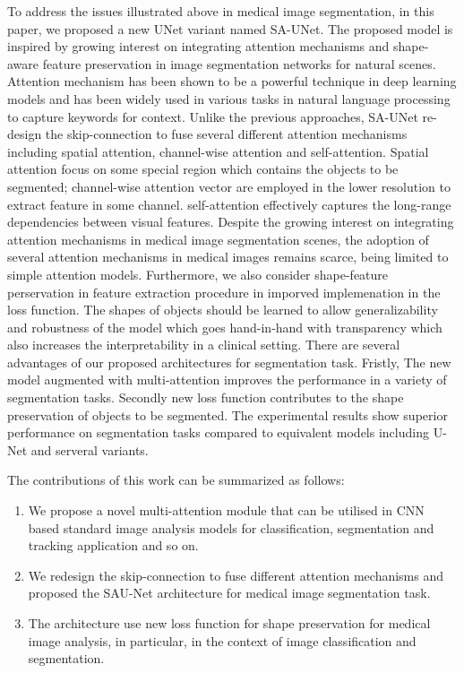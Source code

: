 \documentclass[UTF8]{article} %
\begin{document}
To address the issues illustrated above in medical image segmentation, in this paper, we proposed a new UNet variant named SA-UNet. The proposed model is inspired by growing interest on integrating attention mechanisms and shape-aware feature preservation in image segmentation networks for natural scenes. Attention mechanism has been shown to be a powerful technique in deep learning models and has been widely used in various tasks in natural language processing to capture keywords for context. Unlike the previous approaches, SA-UNet re-design the skip-connection to fuse several different attention mechanisms including spatial attention, channel-wise attention and self-attention. Spatial attention focus on some special region which contains the objects to be segmented; channel-wise attention vector are employed in the lower resolution to extract feature in some channel. self-attention effectively captures the long-range dependencies between visual features. Despite the growing interest on integrating attention mechanisms in medical image segmentation scenes, the adoption of several attention mechanisms in medical images remains scarce, being limited to simple attention models. Furthermore, we also consider shape-feature perservation in feature extraction procedure in imporved implemenation in the loss function.  The shapes of objects should be learned to allow generalizability and robustness of the model which goes hand-in-hand with transparency which also increases the interpretability in a clinical setting. There are several advantages of our proposed architectures for segmentation task. Fristly, The new model augmented with multi-attention improves the performance in a variety of  segmentation tasks. Secondly new loss function contributes to the shape preservation of objects to be segmented. The experimental results show superior performance on segmentation tasks compared to equivalent models including U-Net and serveral variants. 

The contributions of this work can be summarized as follows:
\begin{enumerate}
\item We propose a novel multi-attention module that can be utilised in CNN based standard image analysis models for classification, segmentation and tracking application and so on.
\item We redesign the skip-connection to fuse different attention mechanisms and proposed the SAU-Net architecture for medical image segmentation task. 
\item The architecture use new loss function for shape preservation for medical image analysis, in particular, in the context of image classification and segmentation.
\end{enumerate}
\end{document}

